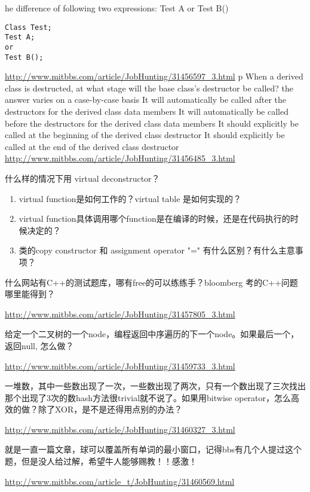 \documentclass[12pt]{book}
\begin{document}
he difference of following two expressions: Test A or Test B()
\lstset{language=java,label= ,caption= ,numbers=none}
\begin{lstlisting}
Class Test;
Test A;
or
Test B();
\end{lstlisting}

\url{http://www.mitbbs.com/article/JobHunting/31456597_3.html}
p
When a derived class is destructed, at what stage will the base class's 
destructor be called?
the answer varies on a case-by-case basis
It will automatically be called after the destructors for the derived class 
data members
It will automatically be called before the destructors for the derived class
data members
It should explicitly be called at the beginning of the derived class 
destructor
It should explicitly be called at the end of the derived class destructor
\url{http://www.mitbbs.com/article/JobHunting/31456485_3.html}

什么样的情况下用 virtual deconstructor？

\begin{enumerate}
\item virtual function是如何工作的？virtual table 是如何实现的？

\item virtual function具体调用哪个function是在编译的时候，还是在代码执行的时候决定的？

\item 类的copy constructor 和 assignment operator "=" 有什么区别？有什么主意事项？
\end{enumerate}

什么网站有C++的测试题库，哪有free的可以练练手？bloomberg 考的C++问题哪里能得到？

\url{http://www.mitbbs.com/article/JobHunting/31457805_3.html}

给定一个二叉树的一个node，编程返回中序遍历的下一个node。如果最后一个，返回null, 怎么做？

\url{http://www.mitbbs.com/article/JobHunting/31459733_3.html}

一堆数，其中一些数出现了一次，一些数出现了两次，只有一个数出现了三次找出那个出现了3次的数hash方法很trivial就不说了。如果用bitwise operator，怎么高效的做？除了XOR，是不是还得用点别的办法？

\url{http://www.mitbbs.com/article/JobHunting/31460327_3.html}

就是一直一篇文章，球可以覆盖所有单词的最小窗口，记得bbs有几个人提过这个题，但是没人给过解，希望牛人能够赐教！！感激！

\url{http://www.mitbbs.com/article_t/JobHunting/31460569.html}
\end{document}

